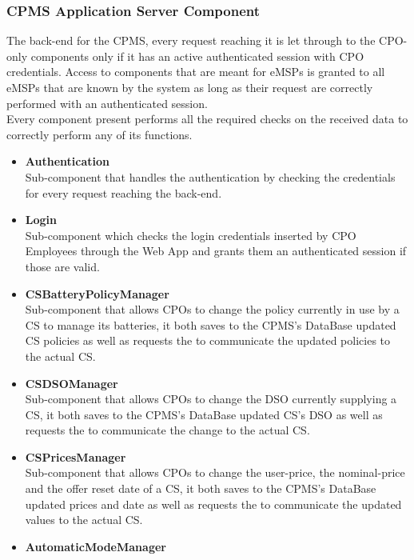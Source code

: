 \documentclass[11pt]{article}
\begin{document}
\subsubsection{CPMS Application Server Component}

The back-end for the CPMS, every request reaching it is let through to the CPO-only components only if it has an active authenticated session with CPO credentials. Access to components that are meant for eMSPs is granted to all eMSPs that are known by the system as long as their request are correctly performed with an authenticated session. \\
Every component present performs all the required checks on the received data to correctly perform any of its functions.

\begin{itemize}
    \item \textbf{Authentication} \\
        Sub-component that handles the authentication by checking the credentials for every request reaching the back-end.
    \item \textbf{Login} \\
        Sub-component which checks the login credentials inserted by CPO Employees through the Web App and grants them an authenticated session if those are valid.
    \item \textbf{CSBatteryPolicyManager} \\
        Sub-component that allows CPOs to change the policy currently in use by a CS to manage its batteries, it both saves to the CPMS's DataBase updated CS policies as well as requests the  to communicate the updated policies to the actual CS.
    \item \textbf{CSDSOManager} \\
        Sub-component that allows CPOs to change the DSO currently supplying a CS, it both saves to the CPMS's DataBase updated CS's DSO as well as requests the  to communicate the change to the actual CS.
    \item \textbf{CSPricesManager} \\
        Sub-component that allows CPOs to change the user-price, the nominal-price and the offer reset date of a CS, it both saves to the CPMS's DataBase updated prices and date as well as requests the  to communicate the updated values to the actual CS.
    \item \textbf{AutomaticModeManager} \\

\end{itemize}
\end{document}
